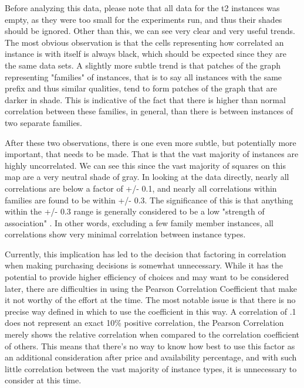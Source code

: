 \documentclass[thesis,proposal]{umassthesis}  %
\begin{document}
Before analyzing this data, please note that all data for the t2 instances was empty, as they were too small for the experiments run, and thus their shades should be ignored. Other than this, we can see very clear and very useful trends. The most obvious observation is that the cells representing how correlated an instance is with itself is always black, which should be expected since they are the same data sets. A slightly more subtle trend is that patches of the graph representing "families" of instances, that is to say all instances with the same prefix and thus similar qualities, tend to form patches of the graph that are darker in shade. This is indicative of the fact that there is higher than normal correlation between these families, in general, than there is between instances of two separate families.\par

After these two observations, there is one even more subtle, but potentially more important, that needs to be made. That is that the vast majority of instances are highly uncorrelated. We can see this since the vast majority of squares on this map are a very neutral shade of gray. In looking at the data directly, nearly all correlations are below a factor of +/- 0.1, and nearly all correlations within families are found to be within +/- 0.3. The significance of this is that anything within the +/- 0.3 range is generally considered to be a low "strength of association" \cite{pearsonCoeff}. In other words, excluding a few family member instances, all correlations show very minimal correlation between instance types.\par

Currently, this implication has led to the decision that factoring in correlation when making purchasing decisions is somewhat unnecessary. While it has the potential to provide higher efficiency of choices and may want to be considered later, there are difficulties in using the Pearson Correlation Coefficient that make it not worthy of the effort at the time. The most notable issue is that there is no precise way defined in which to use the coefficient in this way. A correlation of .1 does not represent an exact 10\% positive correlation, the Pearson Correlation merely shows the relative correlation when compared to the correlation coefficient of others. This means that there's no way to know how best to use this factor as an additional consideration after price and availability percentage, and with such little correlation between the vast majority of instance types, it is unnecessary to consider at this time.\par
\end{document}
